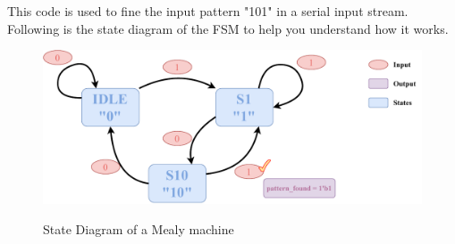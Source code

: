 \documentclass{article}
\begin{document}
This code is used to fine the input pattern "101" in a serial input stream. Following is the state diagram of the FSM to help you understand how it works.
\begin{figure}[h]
    \centering
    \includegraphics[width=\textwidth]{figures/state_diagram.pdf}
    \label{fig:FSM}
    \caption{State Diagram of a Mealy machine}
\end{figure}
\end{document}
